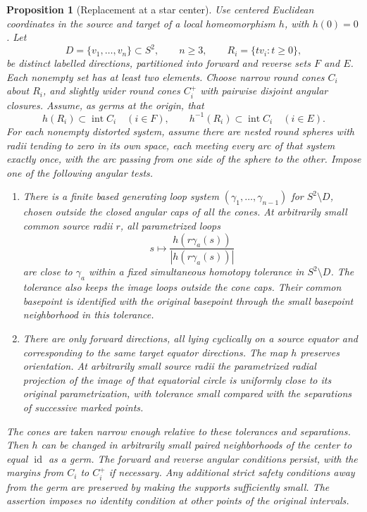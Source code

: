 \documentclass[11pt]{article}
\numberwithin{equation}{section}
\newtheorem{proposition}[theorem]{Proposition}
\theoremstyle{definition}
\theoremstyle{remark}
\newcommand{\Id}{\operatorname{id}}
\begin{document}
\begin{proposition}[Replacement at a star center]\label{lt:star-replacement}\label{lt:star}
Use centered Euclidean coordinates in the source and target of a local
homeomorphism $h$, with $h(0)=0$.  Let
\[
 D=\{v_1,\ldots,v_n\}\subset S^2,\qquad n\geq3,
 \qquad R_i=\{t v_i:t\geq0\},
\]
be distinct labelled directions, partitioned into forward and reverse
sets $F$ and $E$.  Each nonempty set has at least two elements.
Choose narrow round cones $C_i$ about $R_i$, and slightly wider round
cones $C_i^+$ with pairwise disjoint angular closures.  Assume, as germs
at the origin, that
\[
 h(R_i)\subset\operatorname{int}C_i\quad(i\in F),
 \qquad h^{-1}(R_i)\subset\operatorname{int}C_i\quad(i\in E).
\]
For each nonempty distorted system, assume there are nested round
spheres with radii tending to zero in its own space, each meeting every
arc of that system exactly once, with the arc passing from one side of
the sphere to the other.  Impose one of the following angular tests.
\begin{enumerate}
\item There is a finite based generating loop system
$(\gamma_1,\ldots,\gamma_{n-1})$ for $S^2\setminus D$, chosen outside
the closed angular caps of all the cones.  At arbitrarily small common
source radii $r$, all parametrized loops
\[
 s\longmapsto \frac{h(r\gamma_a(s))}{|h(r\gamma_a(s))|}
\]
are close to $\gamma_a$ within a fixed simultaneous homotopy tolerance
in $S^2\setminus D$.  The tolerance also keeps the image loops outside
the cone caps.  Their common basepoint is identified with the original
basepoint through the small basepoint neighborhood in this tolerance.
\item There are only forward directions, all lying cyclically on a
source equator and corresponding to the same target equator
directions.  The map $h$ preserves orientation.  At arbitrarily small
source radii the parametrized radial projection of the image of that
equatorial circle is uniformly close to its original parametrization,
with tolerance small compared with the separations of successive
marked points.
\end{enumerate}
The cones are taken narrow enough relative to these tolerances and
separations.  Then $h$ can be changed in arbitrarily small paired
neighborhoods of the center to equal $\Id$ as a germ.  The forward and
reverse angular conditions persist, with the margins from $C_i$ to
$C_i^+$ if necessary.  Any additional strict safety conditions away
from the germ are preserved by making the supports sufficiently small.
The assertion imposes no identity condition at other points of the
original intervals.
\end{proposition}
\end{document}
